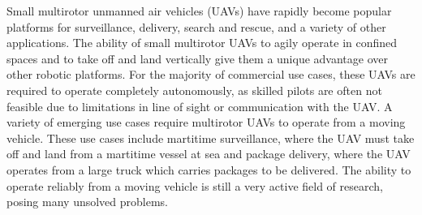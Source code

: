 
Small multirotor unmanned air vehicles (UAVs) have rapidly become popular platforms for
surveillance, delivery, search and rescue, and a variety of other applications.
The ability of small multirotor UAVs to agily operate in confined spaces and to
take off and land vertically give them a unique advantage over other robotic
platforms. For the majority of commercial use cases, these UAVs are required to operate
completely autonomously, as skilled pilots are often not feasible due to
limitations in line of sight or communication with the UAV. 
A variety of emerging use cases
require multirotor UAVs to operate from a moving vehicle.
These use
cases include martitime surveillance, where the UAV must take off and land from
a martitime vessel at sea
and package delivery, where the UAV operates from a large truck
which carries packages to be delivered. The ability to operate reliably from a
moving vehicle is still a very active field of research, posing many unsolved
problems.




